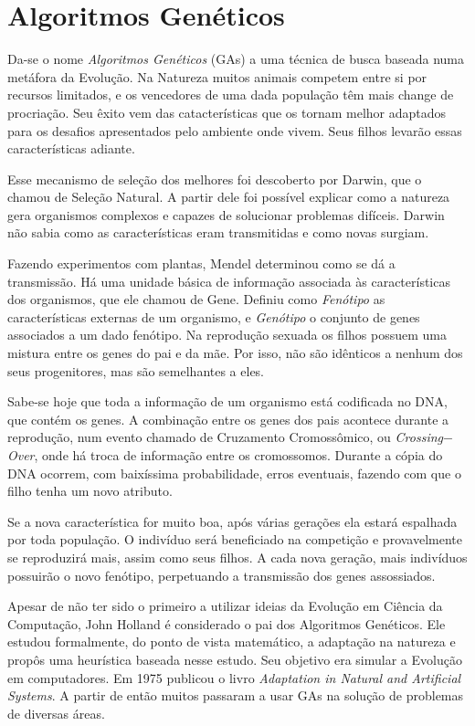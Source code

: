 \chapter{Algoritmos Genéticos\label{cap:ga}}

Da-se o nome \emph{Algoritmos Genéticos} (GAs) a uma técnica de busca baseada numa metáfora da Evolução. Na Natureza muitos animais competem entre si por recursos limitados, e os vencedores de uma dada população têm mais change de procriação. Seu êxito vem das catacterísticas que os tornam melhor adaptados para os desafios apresentados pelo ambiente onde vivem. Seus filhos levarão essas características adiante. 

Esse mecanismo de seleção dos melhores foi descoberto por Darwin, que o chamou de Seleção Natural. A partir dele foi possível explicar como a natureza gera organismos complexos e capazes de solucionar problemas difíceis. Darwin não sabia como as características eram transmitidas e como novas surgiam.

Fazendo experimentos com plantas, Mendel determinou como se dá a transmissão. Há uma unidade básica de informação associada às características dos organismos, que ele chamou de Gene. Definiu como \emph{Fenótipo} as características externas de um organismo, e \emph{Genótipo} o conjunto de genes associados a um dado fenótipo. Na reprodução sexuada os filhos possuem uma mistura entre os genes do pai e da mãe. Por isso, não são idênticos a nenhum dos seus progenitores, mas são semelhantes a eles.

Sabe-se hoje que toda a informação de um organismo está codificada no DNA, que contém os genes. A combinação entre os genes dos pais acontece durante a reprodução, num evento chamado de Cruzamento Cromossômico, ou \emph{Crossing$-$Over}, onde há troca de informação entre os cromossomos. Durante a cópia do DNA ocorrem, com baixíssima probabilidade, erros eventuais, fazendo com que o filho tenha um novo atributo. 

Se a nova característica for muito boa, após várias gerações ela estará espalhada por toda população. O indivíduo será beneficiado na competição e provavelmente se reproduzirá mais, assim como seus filhos. A cada nova geração, mais indivíduos possuirão o novo fenótipo, perpetuando a transmissão dos genes assossiados. 

Apesar de não ter sido o primeiro a utilizar ideias da Evolução em Ciência da Computação, John Holland é considerado o pai dos Algoritmos Genéticos. Ele estudou formalmente, do ponto de vista matemático, a adaptação na natureza e propôs uma heurística baseada nesse estudo. Seu objetivo era simular a Evolução em computadores. Em 1975 publicou o livro \emph{Adaptation in Natural and Artificial Systems}. A partir de então muitos passaram a usar GAs na solução de problemas de diversas áreas.

